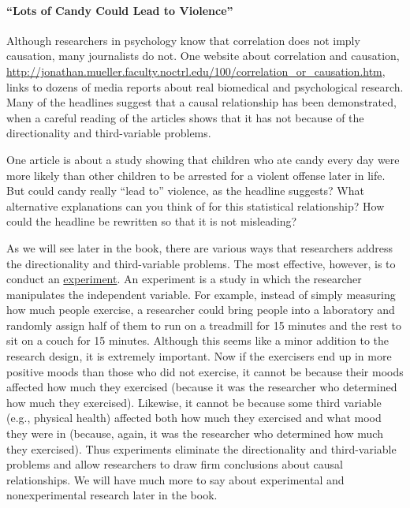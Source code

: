 \documentclass[
]{krantz}
\begin{document}
\hypertarget{lots-of-candy-could-lead-to-violence}{%
\paragraph*{``Lots of Candy Could Lead to Violence''}\label{lots-of-candy-could-lead-to-violence}}

Although researchers in psychology know that correlation does not imply causation, many journalists do not. One website about correlation and causation, \url{http://jonathan.mueller.faculty.noctrl.edu/100/correlation_or_causation.htm}, links to dozens of media reports about real biomedical and psychological research. Many of the headlines suggest that a causal relationship has been demonstrated, when a careful reading of the articles shows that it has not because of the directionality and third-variable problems.

One article is about a study showing that children who ate candy every day were more likely than other children to be arrested for a violent offense later in life. But could candy really ``lead to'' violence, as the headline suggests? What alternative explanations can you think of for this statistical relationship? How could the headline be rewritten so that it is not misleading?

As we will see later in the book, there are various ways that researchers address the directionality and third-variable problems. The most effective, however, is to conduct an \protect\hyperlink{experiment-2}{experiment}. An experiment is a study in which the researcher manipulates the independent variable. For example, instead of simply measuring how much people exercise, a researcher could bring people into a laboratory and randomly assign half of them to run on a treadmill for 15 minutes and the rest to sit on a couch for 15 minutes. Although this seems like a minor addition to the research design, it is extremely important. Now if the exercisers end up in more positive moods than those who did not exercise, it cannot be because their moods affected how much they exercised (because it was the researcher who determined how much they exercised). Likewise, it cannot be because some third variable (e.g., physical health) affected both how much they exercised and what mood they were in (because, again, it was the researcher who determined how much they exercised). Thus experiments eliminate the directionality and third-variable problems and allow researchers to draw firm conclusions about causal relationships. We will have much more to say about experimental and nonexperimental research later in the book.
\end{document}
